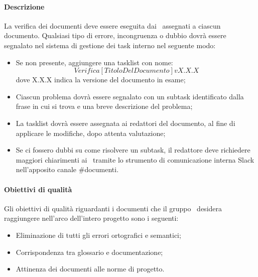 \documentclass[../NormeDiProgetto_v3.0.0.tex]{subfiles}
\begin{document}
			\paragraph{Descrizione}
			La verifica dei documenti deve essere eseguita dai \verificatori\ assegnati a ciascun documento. Qualsiasi tipo di errore, incongruenza o dubbio dovrà essere segnalato nel sistema di gestione dei task interno  nel seguente modo:
			\begin{itemize}
				\item Se non presente, aggiungere una tasklist con nome:\\
				\begin{equation*}
					Verifica [TitoloDelDocumento] vX.X.X
				\end{equation*}
				dove X.X.X indica la versione del documento in esame;
				\item Ciascun problema dovrà essere segnalato con un subtask identificato dalla frase in cui si trova e una breve descrizione del problema;
				\item La tasklist dovrà essere assegnata ai redattori del documento, al fine di applicare le modifiche, dopo attenta valutazione;
				\item Se ci fossero dubbi su come risolvere un subtask, il redattore deve richiedere maggiori chiarimenti ai \verificatori\ tramite lo strumento di comunicazione interna Slack nell'apposito canale \#documenti.
			\end{itemize}

			\paragraph{Obiettivi di qualità}
			Gli obiettivi di qualità riguardanti i documenti che il gruppo \kpanic\ desidera raggiungere nell'arco dell'intero progetto sono i seguenti:
			\begin{itemize}
				\item Eliminazione di tutti gli errori ortografici e semantici;
				\item Corrispondenza tra glossario e documentazione;
				\item Attinenza dei documenti alle norme di progetto.
			\end{itemize}
			
\end{document}
